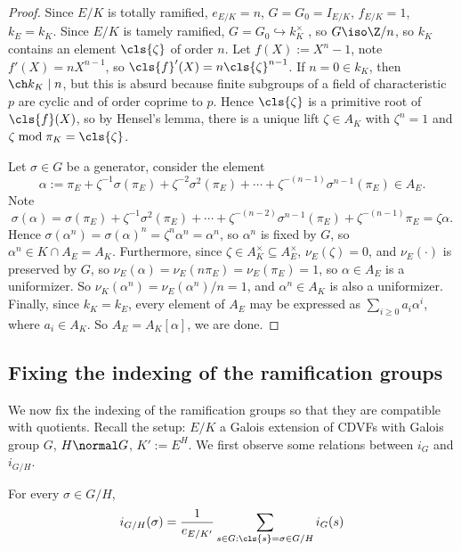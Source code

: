 \documentclass[11pt]{amsart}
\begin{document}
\begin{proof}
    Since $E/K$ is totally ramified, $e_{E/K} = n$, $G = G_0 = I_{E/K}$,
    $f_{E/K} = 1$, $k_E = k_K$.  Since $E/K$ is tamely ramified, $G = G_0
    \hookrightarrow k_K^\times$ , so $G \iso \Z/n$, so $k_K$ contains an element
    $\cls{\zeta}$ of order $n$.  Let $f(X) := X^n - 1$, note $f'(X) = nX^{n-1}$,
    so $\cls{f}'(X) = n \cls{\zeta}^{n-1}$.  If $n = 0 \in k_K$, then $\ch k_K
    \mid n$, but this is absurd because finite subgroups of a field of
    characteristic $p$ are cyclic and of order coprime to $p$.  Hence
    $\cls{\zeta}$ is a primitive root of $\cls{f}(X)$, so by Hensel's lemma,
    there is a unique lift $\zeta \in A_K$ with $\zeta^n = 1$ and $\zeta \bmod
    \pi_K = \cls{\zeta}$.

    Let $\sigma \in G$ be a generator, consider the element
    \[
        \alpha := \pi_E  + \zeta^{-1} \sigma(\pi_E) + \zeta^{-2} \sigma^2(\pi_E)
        + \cdots + \zeta^{-(n-1)} \sigma^{n-1}(\pi_E) \in A_E.
    \]
    Note
    \[
        \sigma(\alpha) = \sigma(\pi_E) + \zeta^{-1} \sigma^2(\pi_E) + \cdots +
        \zeta^{-(n-2)} \sigma^{n-1}(\pi_E) + \zeta^{-(n-1)} \pi_E
        = \zeta \alpha.
    \]
    Hence $\sigma(\alpha^n) = \sigma(\alpha)^n = \zeta^n \alpha^n = \alpha^n$,
    so $\alpha^n$ is fixed by $G$, so $\alpha^n \in K \cap A_E = A_K$.
    Furthermore, since $\zeta \in A_K^\times \subseteq A_E^\times$,
    $\nu_E(\zeta) = 0$, and $\nu_E(\cdot)$ is preserved by $G$, so
    $\nu_E(\alpha) = \nu_E(n \pi_E) = \nu_E(\pi_E) = 1$, so $\alpha \in A_E$ is
    a uniformizer.  So $\nu_K(\alpha^n) = \nu_E(\alpha^n)/n = 1$, and $\alpha^n
    \in A_K$ is also a uniformizer.  Finally, since $k_K = k_E$, every element
    of $A_E$ may be expressed as $\sum_{i \geq 0} a_i \alpha^i$, where $a_i \in
    A_K$.  So $A_E = A_K[\alpha]$, we are done.
\end{proof}

\subsection{Fixing the indexing of the ramification groups}

We now fix the indexing of the ramification groups so that they are compatible
with quotients.  Recall the setup: $E/K$ a Galois extension of CDVFs with Galois
group $G$, $H \normal G$, $K' := E^H$.  We first observe some relations between
$i_G$ and $i_{G/H}$.

\begin{prop}
    \label{prop:tate-index}
    For every $\sigma \in G/H$,
    \[
        i_{G/H}(\sigma) = \frac{1}{e_{E/K'}} \sum_{s \in G : \cls{s} = \sigma
            \in G/H} i_G(s)
    \]
\end{prop}
\end{document}
